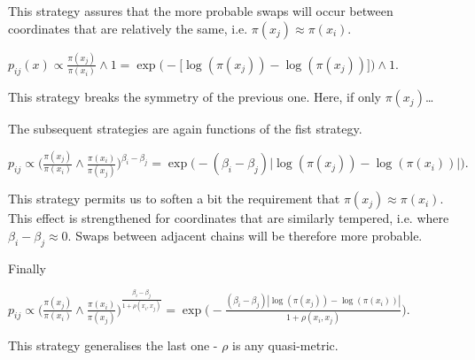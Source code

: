 This strategy assures that the more probable swaps will occur between coordinates that are relatively the same, i.e. $\pi (x_j) \approx \pi (x_i)$. 

\begin{strategy}[resume]
	\item 
		$
			p_{ij}(x) \propto 
			\frac{\pi (x_j)}{\pi (x_i)} \wedge 1 = 
			\exp \Big( - \big[ \log ( \pi(x_j) ) - \log ( \pi(x_j) ) \big]\Big) \wedge 1.$
\end{strategy}

This strategy breaks the symmetry of the previous one. Here, if only $\pi(x_j)$\dots 


The subsequent strategies are again functions of the fist strategy.

\begin{strategy}[resume]
	\item 
		$p_{ij} \propto 
			\Big( \frac{\pi (x_j)}{\pi( x_i )} \wedge 
			\frac{\pi (	x_i)}{\pi( x_j )} \Big)^{\beta_i - \beta_j} = 
		\exp \Big( - (\beta_i - \beta_j)\big| \log ( \pi(x_j) ) - \log ( \pi(x_i) ) \big| \Big).$ 
\end{strategy}

This strategy permits us to soften a bit the requirement that $\pi(x_j) \approx \pi (x_i)$. This effect is strengthened for coordinates that are similarly tempered, i.e. where $\beta_i - \beta_j \approx 0$. Swaps between adjacent chains will be therefore more probable. 

Finally

\begin{strategy}[resume]
	\item 
		$p_{ij} \propto \Big( \frac{\pi (x_j)}{\pi( x_i )} \wedge \frac{\pi (x_i)}{\pi( x_j )} \Big)^\frac{\beta_i - \beta_j}{1 + \rho(x_i, x_j)} = \exp \Big( - \frac{(\beta_i - \beta_j)| \log ( \pi(x_j) ) - \log ( \pi(x_i) ) |}{{1 + \rho(x_i, x_j)}} \Big).$
\end{strategy} 

This strategy generalises the last one - $\rho$ is any quasi-metric. 
